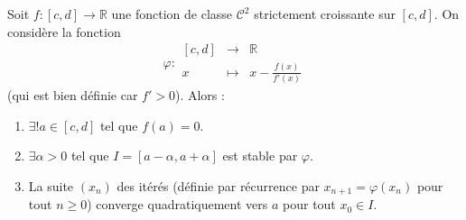 






  \begin{theorem}
    Soit $f : [c, d] \rightarrow \mathbb{R}$ une fonction de classe $\mathcal{C}^2$ strictement croissante sur $[c, d]$. On considère la fonction
    \[ \varphi :
    \begin{array}{ccc}
      [c, d] &\rightarrow& \mathbb{R} \\
      x &\mapsto& x - \frac{f(x)}{f'(x)}
    \end{array}
    \]
    (qui est bien définie car $f' > 0$). Alors :
    \begin{enumerate}[label={\bfseries(\roman*)}]
      \item $\exists! a \in [c, d]$ tel que $f(a) = 0$.
      \item $\exists \alpha > 0$ tel que $I = [a - \alpha, a + \alpha]$ est stable par $\varphi$.
      \item La suite $(x_n)$ des itérés (définie par récurrence par $x_{n+1} = \varphi(x_n)$ pour tout $n \geq 0$) converge quadratiquement vers $a$ pour tout $x_0 \in I$.
    \end{enumerate}
  \end{theorem}

